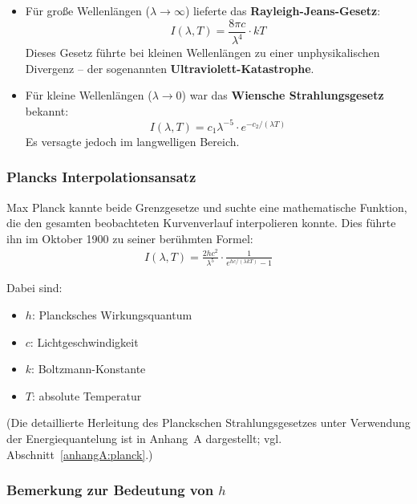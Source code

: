 \begin{itemize}
	\item Für große Wellenlängen (\(\lambda \to \infty\)) lieferte das \textbf{Rayleigh-Jeans-Gesetz}:
	\[
	I(\lambda, T) = \frac{8\pi c}{\lambda^4} \cdot kT
	\]
	Dieses Gesetz führte bei kleinen Wellenlängen zu einer unphysikalischen Divergenz – der sogenannten \textbf{Ultraviolett-Katas\-trophe}.
	
	\item Für kleine Wellenlängen (\(\lambda \to 0\)) war das \textbf{Wiensche Strahlungsgesetz} bekannt:
	\[
	I(\lambda, T) = c_1 \lambda^{-5} \cdot e^{-c_2/(\lambda T)}
	\]
	Es versagte jedoch im langwelligen Bereich.
\end{itemize}

\subsubsection{Plancks Interpolationsansatz}

Max Planck kannte beide Grenzgesetze und suchte eine mathematische Funktion, die den gesamten beobachteten Kurvenverlauf interpolieren konnte. Dies führte ihn im Oktober 1900 zu seiner berühmten Formel:
\begin{align}
	I(\lambda, T) = \frac{2hc^2}{\lambda^5} \cdot \frac{1}{e^{hc/(\lambda kT)} - 1}
\end{align}

Dabei sind:
\begin{itemize}
	\item \( h \): Plancksches Wirkungsquantum
	\item \( c \): Lichtgeschwindigkeit
	\item \( k \): Boltzmann-Konstante
	\item \( T \): absolute Temperatur
\end{itemize}
\raggedbottom
(Die detaillierte Herleitung des Planckschen Strahlungsgesetzes unter Verwendung der Energiequantelung ist in Anhang~A dargestellt; vgl. Abschnitt~\ref{anhangA:planck}.)
\subsubsection{Bemerkung zur Bedeutung von \( h \)}
\raggedbottom

